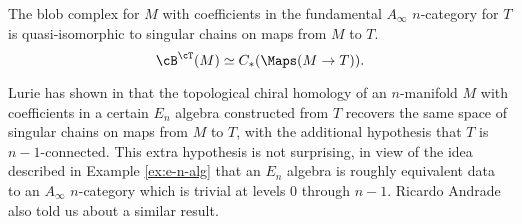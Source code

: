 \begin{thm}
\label{thm:map-recon}
The blob complex for $M$ with coefficients in the fundamental $A_\infty$ $n$-category for $T$ 
is quasi-isomorphic to singular chains on maps from $M$ to $T$.
$$\cB^\cT(M) \simeq C_*(\Maps(M\to T)).$$
\end{thm}
\begin{rem}
Lurie has shown in \cite[Theorem 3.8.6]{0911.0018} that the topological chiral homology 
of an $n$-manifold $M$ with coefficients in a certain $E_n$ algebra constructed from $T$ recovers 
the same space of singular chains on maps from $M$ to $T$, with the additional hypothesis that $T$ is $n-1$-connected.
This extra hypothesis is not surprising, in view of the idea described in Example \ref{ex:e-n-alg} 
that an $E_n$ algebra is roughly equivalent data to an $A_\infty$ $n$-category which 
is trivial at levels 0 through $n-1$.
Ricardo Andrade also told us about a similar result.
\end{rem}

